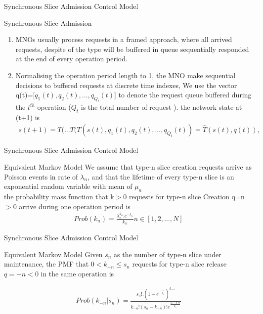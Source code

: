 \documentclass{beamer}
\begin{document}
\begin{frame}{Synchronous Slice Admission Control Model}
\begin{block}{Synchronous Slice Admission}
\begin{enumerate}
\item MNOs usually process requests in a framed approach, where all arrived requests, despite of the type will be buffered in queue sequentially responded at the end of every operation period.
\item Normalising the operation period length to 1, the MNO make sequential decisions to buffered requests at discrete time indexes, We use the vector q(t)=[$q_{1}(t),q_{2}(t),...,q_{Q_{t}}(t)$] to denote the request queue buffered during the $t^{th}$ operation ($Q_{t}$ is the total number of request ). the network state at  (t+1) is \\
\begin{align}
s(t+1) = T(...T(T( s(t), q_{1}(t), q_{2}(t),..., q_{Q_{t}}(t))= \hat{T}(s(t),q(t)),
\end{align}
\end{enumerate}
\end{block}
\end{frame}
\begin{frame}{Synchronous Slice Admission Control Model}
\begin{block}{Equivalent Markov Model}
We assume that type-n slice creation requests arrive as Poisson events in rate of $\lambda_{n}$, and that the lifetime of every type-n slice is an exponential random variable with mean of $\mu_{n}$\\
 the probability mass function that k$>$0 requests for type-n slice Creation q=n$>$0 arrive during one operation period is \\
\begin{align}
Prob(k_{n}) =  \frac{\lambda_{n}^{k_{n}}. e^{-\lambda_{n}}}{k_{n}\!}     n\in [1,2,...,N]
\end{align}
\end{block}
\end{frame}
\begin{frame}{Synchronous Slice Admission Control Model}
\begin{block}{Equivalent Markov Model}
 Given $s_{n}$ as the number of type-n slice under maintenance, the PMF that $0<k_{-n}\le s_{n}$ requests for type-n slice release $q=-n<0$ in the same operation is \\
\begin{lemma}
\begin{align}
   Prob(k_{-n} |s_{n}) = \frac {s_{n}!.(1- e^{-\frac{1}{\mu_{n}}})^{k_{-n}}}{k_{-n}!(s_{n}-k_{-n})!e^{\frac{s_n-k_-n}{\mu_n}  }}
 \end{align}
 \end{lemma}
\end{block}
\end{frame}
\end{document}

